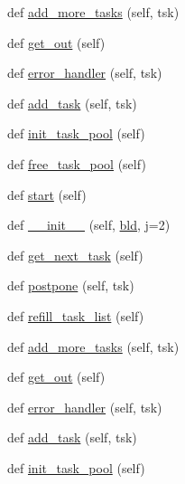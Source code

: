 \begin{DoxyCompactItemize}
\item 
def \hyperlink{classwaflib_1_1_runner_1_1_parallel_a7501769205be6d24343c054f46e43289}{add\+\_\+more\+\_\+tasks} (self, tsk)
\item 
def \hyperlink{classwaflib_1_1_runner_1_1_parallel_aa5803cc70ce58b6f1ed09d8e4414aeef}{get\+\_\+out} (self)
\item 
def \hyperlink{classwaflib_1_1_runner_1_1_parallel_a5687053d52ada326ac8754dc15bd5138}{error\+\_\+handler} (self, tsk)
\item 
def \hyperlink{classwaflib_1_1_runner_1_1_parallel_a7b6dec41418a4eb5a39aa35756ef39c6}{add\+\_\+task} (self, tsk)
\item 
def \hyperlink{classwaflib_1_1_runner_1_1_parallel_a847fede29cb9dfe31b6b694e1044d100}{init\+\_\+task\+\_\+pool} (self)
\item 
def \hyperlink{classwaflib_1_1_runner_1_1_parallel_aed9785fdb3b1d54bbdc5520942ebe237}{free\+\_\+task\+\_\+pool} (self)
\item 
def \hyperlink{classwaflib_1_1_runner_1_1_parallel_a091adebadfabd759640c7347de4b05e2}{start} (self)
\item 
def \hyperlink{classwaflib_1_1_runner_1_1_parallel_a0c0a52852b556178d86233e354383f51}{\+\_\+\+\_\+init\+\_\+\+\_\+} (self, \hyperlink{classwaflib_1_1_runner_1_1_parallel_a710f2069db915f1b04538ed7989511ff}{bld}, j=2)
\item 
def \hyperlink{classwaflib_1_1_runner_1_1_parallel_a13620afd7fb0dac47215c1a434c3a79a}{get\+\_\+next\+\_\+task} (self)
\item 
def \hyperlink{classwaflib_1_1_runner_1_1_parallel_ab025fd073c2f52e72df1a3bc8d188d0e}{postpone} (self, tsk)
\item 
def \hyperlink{classwaflib_1_1_runner_1_1_parallel_a2f7785b4be91f45b53a9f294fb3a990e}{refill\+\_\+task\+\_\+list} (self)
\item 
def \hyperlink{classwaflib_1_1_runner_1_1_parallel_a7501769205be6d24343c054f46e43289}{add\+\_\+more\+\_\+tasks} (self, tsk)
\item 
def \hyperlink{classwaflib_1_1_runner_1_1_parallel_aa5803cc70ce58b6f1ed09d8e4414aeef}{get\+\_\+out} (self)
\item 
def \hyperlink{classwaflib_1_1_runner_1_1_parallel_a5687053d52ada326ac8754dc15bd5138}{error\+\_\+handler} (self, tsk)
\item 
def \hyperlink{classwaflib_1_1_runner_1_1_parallel_a7b6dec41418a4eb5a39aa35756ef39c6}{add\+\_\+task} (self, tsk)
\item 
def \hyperlink{classwaflib_1_1_runner_1_1_parallel_a847fede29cb9dfe31b6b694e1044d100}{init\+\_\+task\+\_\+pool} (self)

\end{DoxyCompactItemize}
